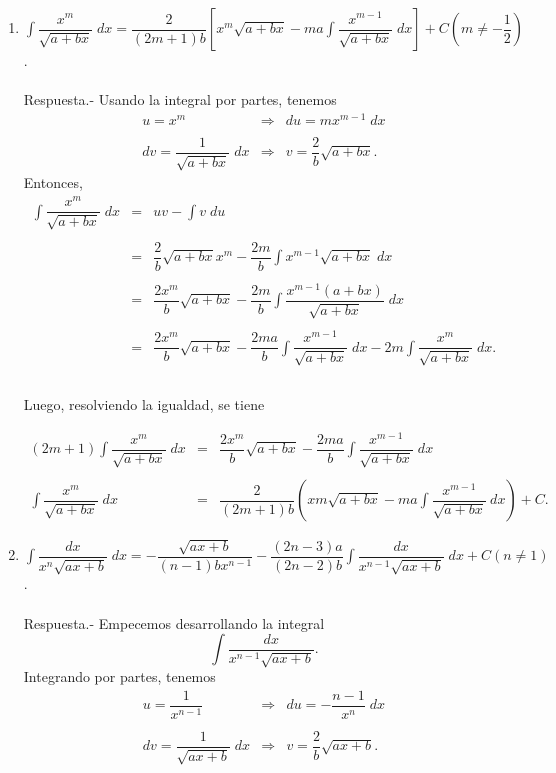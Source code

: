 \begin{enumerate}[\bfseries 1.]
    \item $\displaystyle\int \dfrac{x^m}{\sqrt{a+bx}}\; dx = \dfrac{2}{(2m+1)b}\left[x^m \sqrt{a+bx}-ma\int \dfrac{x^{m-1}}{\sqrt{a+bx}}\; dx\right]+C \left(m\neq -\dfrac{1}{2}\right)$.\\\\
	Respuesta.-\; Usando la integral por partes, tenemos
	$$
	\begin{array}{rcl}
	    u=x^m &\Rightarrow& du=mx^{m-1}\; dx\\\\
	    dv=\dfrac{1}{\sqrt{a+bx}}\; dx &\Rightarrow& v=\dfrac{2}{b}\sqrt{a+bx}.
	\end{array}
	$$
	Entonces,
	$$
	\begin{array}{rcl}
	    \displaystyle\int \dfrac{x^m}{\sqrt{a+bx}}\; dx &=& uv-\displaystyle\int v\; du\\\\
							    &=& \dfrac{2}{b}\sqrt{a+bx}x^m - \dfrac{2m}{b}\displaystyle\int x^{m-1}\sqrt{a+bx}\; dx\\\\
							    &=& \dfrac{2x^m}{b}\sqrt{a+bx} - \dfrac{2m}{b} \displaystyle\int \dfrac{x^{m-1}(a+bx)}{\sqrt{a+bx}}\; dx\\\\
							    &=& \dfrac{2x^m}{b}\sqrt{a+bx} - \dfrac{2ma}{b} \displaystyle\int \dfrac{x^{m-1}}{\sqrt{a+bx}}\; dx - 2m \int \dfrac{x^m}{\sqrt{a+bx}}\; dx.\\\\
	\end{array}
	$$

	Luego, resolviendo la igualdad, se tiene

	$$
	\begin{array}{rcl}
	    (2m+1)\displaystyle\int \dfrac{x^m}{\sqrt{a+bx}}\; dx &=& \dfrac{2x^m}{b} \sqrt{a+bx} - \dfrac{2ma}{b} \displaystyle\int \dfrac{x^{m-1}}{\sqrt{a+bx}}\; dx\\\\
	    \displaystyle\int \dfrac{x^m}{\sqrt{a+bx}}\; dx &=& \dfrac{2}{(2m+1)b}\left(xm \sqrt{a+bx}-ma \displaystyle\int \dfrac{x^{m-1}}{\sqrt{a+bx}}\ dx\right)+C.
	\end{array}
	$$
	\vspace{0.5cm}

    \item $\displaystyle\int \dfrac{dx}{x^n\sqrt{ax+b}}\; dx = -\dfrac{\sqrt{ax+b}}{(n-1)bx^{n-1}}-\dfrac{(2n-3)a}{(2n-2)b}\int \dfrac{dx}{x^{n-1}\sqrt{ax+b}}\; dx + C(n\neq 1)$.\\\\
	Respuesta.-\; Empecemos desarrollando la integral
	$$\int \dfrac{dx}{x^{n-1}\sqrt{ax+b}}.$$
	Integrando por partes, tenemos
	$$
	\begin{array}{rcl}
	    u = \dfrac{1}{x^{n-1}} &\Rightarrow& du = -\dfrac{n-1}{x^n}\; dx\\\\
	    dv = \dfrac{1}{\sqrt{ax+b}}\; dx &\Rightarrow& v = \dfrac{2}{b}\sqrt{ax+b}.
	\end{array}
	$$


\end{enumerate}
